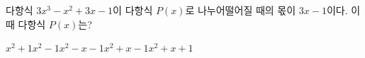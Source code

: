다항식 $3x^3-x^2+3x-1$이 다항식 $P(x)$로 나누어떨어질 때의 몫이 $3x-1$이다. 이때 다항식 $P(x)$는?
\begin{choicesii}{$x^2+1$}{$x^2-1$}{$x^2-x-1$}{$x^2+x-1$}{$x^2+x+1$}\end{choicesii}
